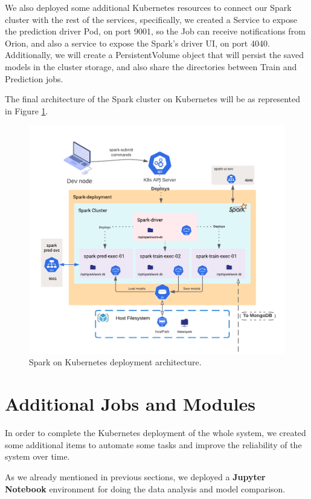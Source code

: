 We also deployed some additional Kubernetes resources to connect our Spark cluster with the rest of the services, specifically, we created a Service to expose the prediction driver Pod, on port 9001, so the Job can receive notifications from Orion, and also a service to expose the Spark's driver UI, on port 4040. Additionally, we will create a PersistentVolume object that will persist the saved models in the cluster storage, and also share the directories between Train and Prediction jobs.

The final architecture of the Spark cluster on Kubernetes will be as represented in Figure \ref{diagram-spark-kube}.
\begin{figure}[H]
	\centering
	\includegraphics[width=0.9\linewidth]{imagenes/diagram-spark-kube.png}
	\caption{Spark on Kubernetes deployment architecture.}
	\label{diagram-spark-kube}
\end{figure}

\clearpage

\section{Additional Jobs and Modules}

In order to complete the Kubernetes deployment of the whole system, we created some additional items to automate some tasks and improve the reliability of the system over time. 

As we already mentioned in previous sections, we deployed a \textbf{Jupyter Notebook} environment for doing the data analysis and model comparison.

